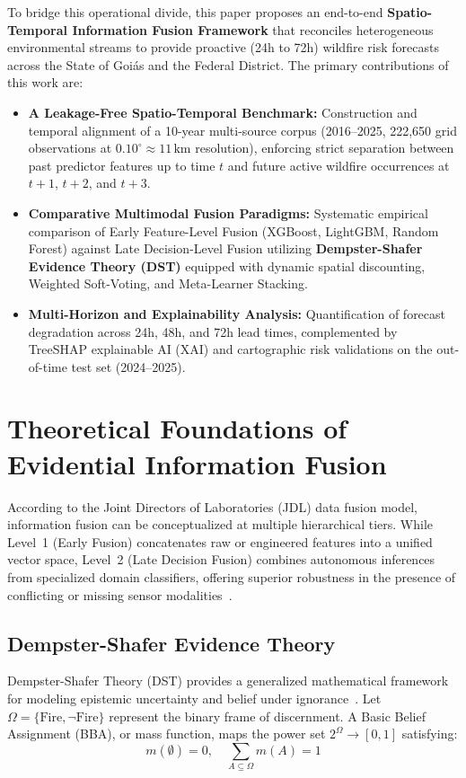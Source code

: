 \documentclass[runningheads]{llncs}
\begin{document}
To bridge this operational divide, this paper proposes an end-to-end \textbf{Spatio-Temporal Information Fusion Framework} that reconciles heterogeneous environmental streams to provide proactive (24h to 72h) wildfire risk forecasts across the State of Goi\'as and the Federal District. The primary contributions of this work are:
\begin{itemize}
    \item \textbf{A Leakage-Free Spatio-Temporal Benchmark:} Construction and temporal alignment of a 10-year multi-source corpus (2016--2025, 222,650 grid observations at $0.10^\circ \approx 11\,\text{km}$ resolution), enforcing strict separation between past predictor features up to time $t$ and future active wildfire occurrences at $t+1$, $t+2$, and $t+3$.
    \item \textbf{Comparative Multimodal Fusion Paradigms:} Systematic empirical comparison of Early Feature-Level Fusion (XGBoost, LightGBM, Random Forest) against Late Decision-Level Fusion utilizing \textbf{Dempster-Shafer Evidence Theory (DST)} equipped with dynamic spatial discounting, Weighted Soft-Voting, and Meta-Learner Stacking.
    \item \textbf{Multi-Horizon and Explainability Analysis:} Quantification of forecast degradation across 24h, 48h, and 72h lead times, complemented by TreeSHAP explainable AI (XAI) and cartographic risk validations on the out-of-time test set (2024--2025).
\end{itemize}

\section{Theoretical Foundations of Evidential Information Fusion}
\label{sec:theory}
According to the Joint Directors of Laboratories (JDL) data fusion model, information fusion can be conceptualized at multiple hierarchical tiers. While Level~1 (Early Fusion) concatenates raw or engineered features into a unified vector space, Level~2 (Late Decision Fusion) combines autonomous inferences from specialized domain classifiers, offering superior robustness in the presence of conflicting or missing sensor modalities~\cite{hall2001handbook}.

\subsection{Dempster-Shafer Evidence Theory}
Dempster-Shafer Theory (DST) provides a generalized mathematical framework for modeling epistemic uncertainty and belief under ignorance~\cite{shafer1976,dempster1967}. Let $\Omega = \{\text{Fire}, \neg\text{Fire}\}$ represent the binary frame of discernment. A Basic Belief Assignment (BBA), or mass function, maps the power set $2^\Omega \to [0, 1]$ satisfying:
\begin{equation}
    m(\emptyset) = 0, \quad \sum_{A \subseteq \Omega} m(A) = 1
\end{equation}
\end{document}
